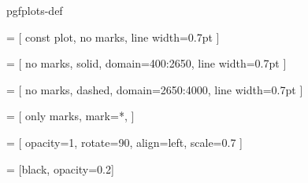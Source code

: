 
{pgfplots-def}


 = [
  const plot,
  no marks,
  line width=0.7pt
]

 = [
  no marks,
  solid,
  domain=400:2650,
  line width=0.7pt
]

 = [
  no marks,
  dashed,
  domain=2650:4000,
  line width=0.7pt
]

 = [
  only marks,
  mark=*,
]

 = [
  opacity=1,
  rotate=90,
  align=left,
  scale=0.7
]

 = [black, opacity=0.2]


